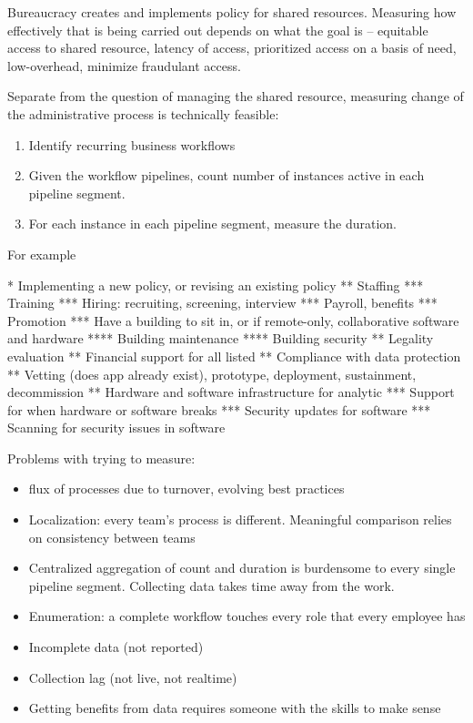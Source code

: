 Bureaucracy creates and implements policy for shared resources. Measuring how effectively that is being carried out depends on what the goal is -- equitable access to shared resource, latency of access, prioritized access on a basis of need, low-overhead, minimize fraudulant access. 

Separate from the question of managing the shared resource, measuring change of the administrative process is technically feasible:
\begin{enumerate}
    \item Identify recurring business workflows
    \item Given the workflow pipelines, count number of instances active in each pipeline segment.
    \item For each instance in each pipeline segment, measure the duration.
\end{enumerate}

For example 

* Implementing a new policy, or revising an existing policy
** Staffing 
*** Training
*** Hiring: recruiting, screening, interview
*** Payroll, benefits
*** Promotion 
*** Have a building to sit in, or if remote-only, collaborative software and hardware 
**** Building maintenance
**** Building security 
** Legality evaluation
** Financial support for all listed 
** Compliance with data protection 
** Vetting (does app already exist), prototype, deployment, sustainment, decommission
** Hardware and software infrastructure for analytic
*** Support for when hardware or software breaks
*** Security updates for software
*** Scanning for security issues in software 


Problems with trying to measure: 
\begin{itemize}
    \item flux of processes due to turnover, evolving best practices
    \item Localization: every team's process is different. Meaningful comparison relies on consistency between teams
    \item Centralized aggregation of count and duration is burdensome to every single pipeline segment. Collecting data takes time away from the work.
    \item Enumeration: a complete workflow touches every role that every employee has 
    \item Incomplete data (not reported)
    \item Collection lag (not live, not realtime) 
    \item Getting benefits from data requires someone with the skills to make sense
\end{itemize}

